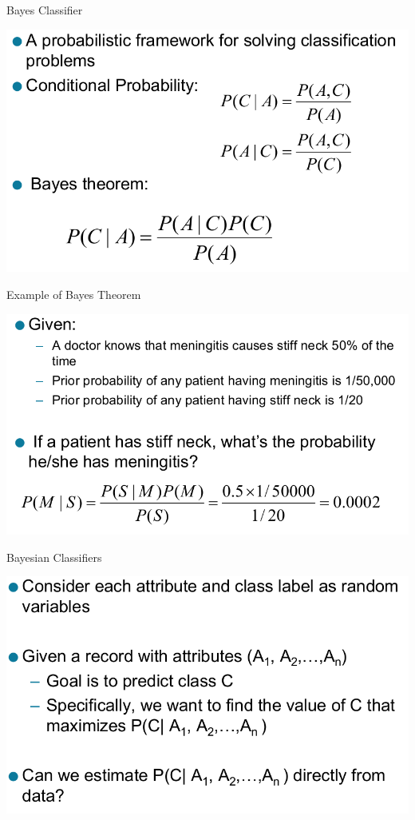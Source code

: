 \documentclass{beamer}
\begin{document}
\begin{frame}{Bayes Classifier}
    \begin{center}
        \includegraphics[scale=0.4]{bayesClassifier1.png}
    \end{center}
\end{frame}
\begin{frame}{Example of Bayes Theorem}
    \begin{center}
        \includegraphics[scale=0.4]{bayesClassifier2.png}
    \end{center}
\end{frame}
\begin{frame}{Bayesian Classifiers}
    \begin{center}
        \includegraphics[scale=0.4]{bayesClassifier3.png}
    \end{center}
\end{frame}
\end{document}
